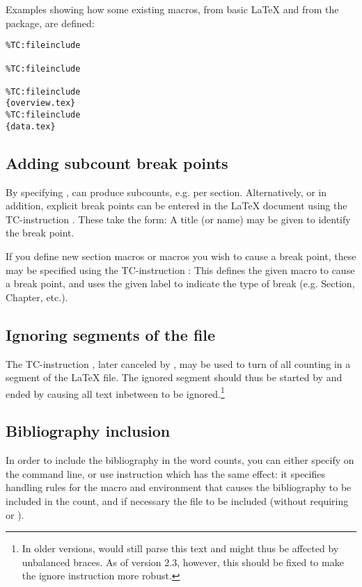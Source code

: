 \documentclass{article}
\begin{document}
Examples showing how some existing macros, from basic \LaTeX{} and from the  package, are defined:

\begin{lstlisting}
%TC:fileinclude 

%TC:fileinclude 

%TC:fileinclude 
{overview.tex}
%TC:fileinclude 
{data.tex}
\end{lstlisting}


\subsection{Adding subcount break points}

By specifying , \TeXcount{} can produce subcounts, e.g. per section. Alternatively, or in addition, explicit break points can be entered in the \LaTeX{} document using the TC-instruction . These take the form:
A title (or name) may be given to identify the break point.

If you define new section macros or macros you wish to cause a break point, these may be specified using the TC-instruction :
This defines the given macro to cause a break point, and uses the given label to indicate the type of break (e.g. Section, Chapter, etc.).


\subsection{Ignoring segments of the file}

The TC-instruction , later canceled by , may be used to turn of all counting in a segment of the \LaTeX{} file. The ignored segment should thus be started by
and ended by
causing all text inbetween to be ignored.\footnote{In older versions, \TeXcount{} would still parse this text and might thus be affected by unbalanced braces. As of version 2.3, however, this should be fixed to make the ignore instruction more robust.}


\subsection{Bibliography inclusion}

In order to include the bibliography in the word counts, you can either specify  on the command line, or use \TeXcount{} instruction
which has the same effect: it specifies handling rules for the  macro and  environment that causes the bibliography to be included in the count, and if necessary the  file to be included (without requiring  or ).
\end{document}
